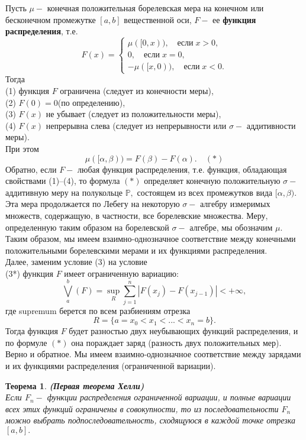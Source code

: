 \documentclass[12pt,a4paper]{article}
\theoremstyle{plain}   \newtheorem{Pro}{Задача}
\newtheorem{The}{Теорема}
\begin{document}
Пусть
$ \mu - $
конечная положительная борелевская мера на конечном или бесконечном
промежутке
$ [a,b] $
вещественной оси,
$ F - $
ее
{\bfseries функция распределения},
т.е.
\begin{equation*}
  F(x)=
    \begin{cases}
	  \mu ([0,x)), \quad если \; x>0,\\
	  0, \quad если \; x=0,\\
	  -\mu ([x,0)), \quad если \; x<0.
	\end{cases}
\end{equation*}
Тогда
\\
(1) функция
$ F $
ограничена (следует из конечности меры),\\
(2) $ F(0)=0 $(по определению),\\
(3) $ F(x) $ не убывает (следует из положительности меры),\\
(4) $ F(x) $ непрерывна слева (следует из непрерывности или
$ \sigma- $ аддитивности меры).\\
При этом
$$
  \mu ([\alpha , \beta ))=F(\beta )-F(\alpha ).
  \quad (\ast )
$$
Обратно, если
$ F - $
любая функция распределения, т.е. функция, обладающая свойствами
(1)--(4), то формула
$ (\ast ) $
определяет конечную положительную
$ \sigma - $
аддитивную меру на полукольце
$ \mathbb{P} , $
состоящем из всех промежутков вида
$ [\alpha , \beta ) . $
Эта мера продолжается по Лебегу на некоторую
$ \sigma- $
алгебру измеримых множеств, содержащую, в частности, все
борелевские множества. Меру, определенную таким образом на
борелевской
$ \sigma- $
алгебре, мы обозначим
$ \mu . $
Таким образом, мы имеем взаимно-однозначное соответствие
между конечными положительными борелевскими мерами и их
функциями распределения.\\
Далее, заменим условие (3) на условие
\\
(3*) функция
$ F $
имеет ограниченную вариацию:
$$
  \bigvee _a ^b (F)=\sup _R \sum _{j=1}^n
  |F(x_j )-F(x_{j-1})|< + \infty ,
$$
где supremum берется по всем разбиениям отрезка
$$
  R=\{ a=x_0 <x_1 <...<x_n =b \} .
$$
Тогда функция
$ F $
будет разностью двух неубывающих функций распределения, и
по формуле
$ (\ast ) $
она пораждает заряд (разность двух положительных мер).
Верно и обратное. Мы имеем взаимно-однозначное соответствие между
зарядами и их функциями распределения (ограниченной вариации).
\begin{The}
{\bfseries (Первая теорема Хелли)}\\
Если
$ F_n - $
функции распределения ограниченной вариации, и полные вариации
всех этих функций ограничены в совокупности, то из последовательности
$ F_n $
можно выбрать подпоследовательность, сходящуюся в каждой точке отрезка
$ [a,b]. $
\end{The}
\end{document}
